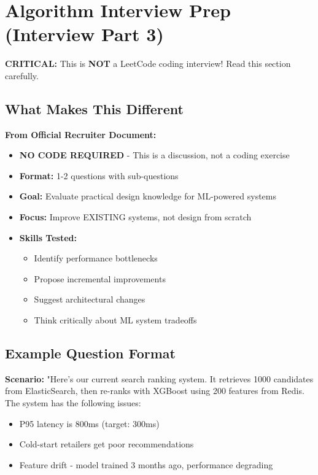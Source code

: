 \documentclass[11pt,letterpaper]{article}
\begin{document}
\section{Algorithm Interview Prep (Interview Part 3)}

\textbf{CRITICAL:} This is \textbf{NOT} a LeetCode coding interview! Read this section carefully.

\subsection{What Makes This Different}

\textbf{From Official Recruiter Document:}
\begin{itemize}
    \item \textbf{NO CODE REQUIRED} - This is a discussion, not a coding exercise
    \item \textbf{Format:} 1-2 questions with sub-questions
    \item \textbf{Goal:} Evaluate practical design knowledge for ML-powered systems
    \item \textbf{Focus:} Improve EXISTING systems, not design from scratch
    \item \textbf{Skills Tested:}
    \begin{itemize}
        \item Identify performance bottlenecks
        \item Propose incremental improvements
        \item Suggest architectural changes
        \item Think critically about ML system tradeoffs
    \end{itemize}
\end{itemize}

\subsection{Example Question Format}

\textbf{Scenario:} "Here's our current search ranking system. It retrieves 1000 candidates from ElasticSearch, then re-ranks with XGBoost using 200 features from Redis. The system has the following issues:
\begin{itemize}
    \item P95 latency is 800ms (target: 300ms)
    \item Cold-start retailers get poor recommendations
    \item Feature drift - model trained 3 months ago, performance degrading
\end{itemize}
\end{document}
